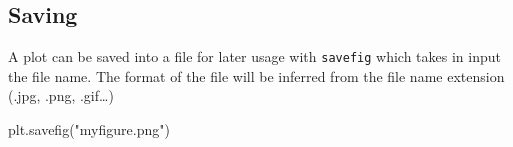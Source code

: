 \subsection{Saving}\label{saving}

A plot can be saved into a file for later usage with \texttt{savefig} which takes in input the file name. The format of the file will be inferred from the file name extension (.jpg, .png, .gif\ldots)

\begin{ipython}
plt.savefig("myfigure.png")
\end{ipython}

%
%
% 
%
%    
%
